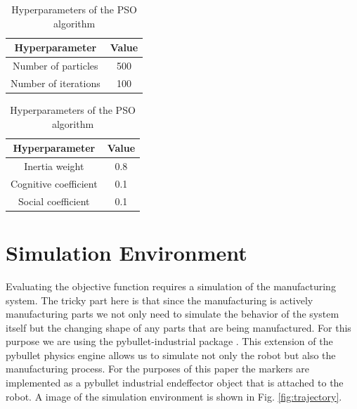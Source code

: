 \documentclass{svproc}
\begin{document}
\begin{table}
    \centering
    \caption{Hyperparameters of the PSO algorithm}
    \begin{minipage}{.45\linewidth}
        \centering
        \begin{tabular}{c|c}
            Hyperparameter & Value \\
            \hline
            Number of particles & 500 \\
            Number of iterations & 100 \\
        \end{tabular}
    \end{minipage}%
    \hspace{0.01\linewidth}%
    \begin{minipage}{.45\linewidth}
        \centering
        \begin{tabular}{c|c}
            Hyperparameter & Value \\
            \hline
            Inertia weight & 0.8 \\
            Cognitive coefficient & 0.1 \\
            Social coefficient & 0.1 \\
        \end{tabular}
    \end{minipage}

    \label{tab:hyperparameters}
\end{table}

\section{Simulation Environment}
Evaluating the objective function requires a simulation of the manufacturing system.
The tricky part here is that since the manufacturing is actively manufacturing parts we not only need to simulate the behavior of the system itself but the changing shape of any parts that are being manufactured.
For this purpose we are using the pybullet-industrial package \cite{pybullet_industrial}.
This extension of the pybullet physics engine allows us to simulate not only the robot but also the manufacturing process.
For the purposes of this paper the markers are implemented as a pybullet industrial endeffector object that is attached to the robot.
A image of the simulation environment is shown in Fig. \ref{fig:trajectory}.
\end{document}

